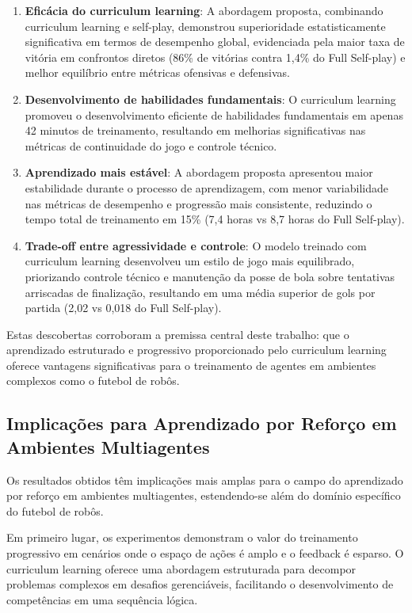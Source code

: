 \begin{enumerate}
    \item \textbf{Eficácia do curriculum learning}: A abordagem proposta, combinando curriculum learning e self-play, demonstrou superioridade estatisticamente significativa em termos de desempenho global, evidenciada pela maior taxa de vitória em confrontos diretos (86\% de vitórias contra 1,4\% do Full Self-play) e melhor equilíbrio entre métricas ofensivas e defensivas.
    
    \item \textbf{Desenvolvimento de habilidades fundamentais}: O curriculum learning promoveu o desenvolvimento eficiente de habilidades fundamentais em apenas 42 minutos de treinamento, resultando em melhorias significativas nas métricas de continuidade do jogo e controle técnico.
    
    \item \textbf{Aprendizado mais estável}: A abordagem proposta apresentou maior estabilidade durante o processo de aprendizagem, com menor variabilidade nas métricas de desempenho e progressão mais consistente, reduzindo o tempo total de treinamento em 15\% (7,4 horas vs 8,7 horas do Full Self-play).
    
    \item \textbf{Trade-off entre agressividade e controle}: O modelo treinado com curriculum learning desenvolveu um estilo de jogo mais equilibrado, priorizando controle técnico e manutenção da posse de bola sobre tentativas arriscadas de finalização, resultando em uma média superior de gols por partida (2,02 vs 0,018 do Full Self-play).
\end{enumerate}

Estas descobertas corroboram a premissa central deste trabalho: que o aprendizado estruturado e progressivo proporcionado pelo curriculum learning oferece vantagens significativas para o treinamento de agentes em ambientes complexos como o futebol de robôs.

\subsection{Implicações para Aprendizado por Reforço em Ambientes Multiagentes}

Os resultados obtidos têm implicações mais amplas para o campo do aprendizado por reforço em ambientes multiagentes, estendendo-se além do domínio específico do futebol de robôs.

Em primeiro lugar, os experimentos demonstram o valor do treinamento progressivo em cenários onde o espaço de ações é amplo e o feedback é esparso. O curriculum learning oferece uma abordagem estruturada para decompor problemas complexos em desafios gerenciáveis, facilitando o desenvolvimento de competências em uma sequência lógica.

